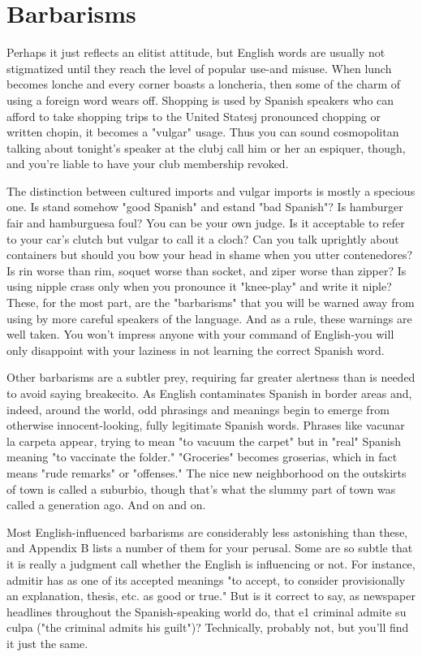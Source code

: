 \section{Barbarisms}

Perhaps it just reflects an elitist attitude, but English words
are usually not stigmatized until they reach the level of popular
use-and misuse. When lunch becomes lonche and every corner
boasts a loncheria, then some of the charm of using a foreign word
wears off. Shopping is used by Spanish speakers who can afford to take
shopping trips to the United Statesj pronounced chopping or written
chopin, it becomes a "vulgar" usage. Thus you can sound cosmopolitan talking about tonight's speaker at the clubj call him or her an espiquer, though, and you're liable to have your club membership revoked.

The distinction between cultured imports and vulgar imports is mostly a specious one. Is stand somehow "good Spanish" and
estand "bad Spanish"? Is hamburger fair and hamburguesa foul? You
can be your own judge. Is it acceptable to refer to your car's clutch but
vulgar to call it a cloch? Can you talk uprightly about containers but
should you bow your head in shame when you utter contenedores? Is
rin worse than rim, soquet worse than socket, and ziper worse than
zipper? Is using nipple crass only when you pronounce it "knee-play"
and write it niple? These, for the most part, are the "barbarisms" that
you will be warned away from using by more careful speakers of the
language. And as a rule, these warnings are well taken. You won't impress anyone with your command of English-you will only disappoint
with your laziness in not learning the correct Spanish word.

Other barbarisms are a subtler prey, requiring far greater alertness than is needed to avoid saying breakecito. As English contaminates Spanish in border areas and, indeed, around the world, odd phrasings and meanings begin to emerge from otherwise innocent-looking,
fully legitimate Spanish words. Phrases like vacunar la carpeta appear,
trying to mean "to vacuum the carpet" but in "real" Spanish meaning
"to vaccinate the folder." "Groceries" becomes groserias, which in
fact means "rude remarks" or "offenses." The nice new neighborhood
on the outskirts of town is called a suburbio, though that's what the
slummy part of town was called a generation ago. And on and on.

Most English-influenced barbarisms are considerably less astonishing than these, and Appendix B lists a number of them for your
perusal. Some are so subtle that it is really a judgment call whether
the English is influencing or not. For instance, admitir has as one of
its accepted meanings "to accept, to consider provisionally an explanation, thesis, etc. as good or true." But is it correct to say, as newspaper
headlines throughout the Spanish-speaking world do, that e1 criminal
admite su culpa ("the criminal admits his guilt")? Technically, probably not, but you'll find it just the same.

